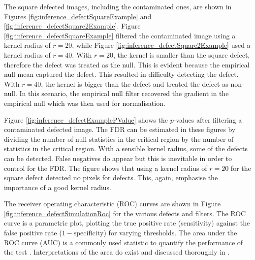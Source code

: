 The square defected images, including the contaminated ones, are shown in Figures \ref{fig:inference_defectSquareExample} and \ref{fig:inference_defectSquare2Example}. Figure \ref{fig:inference_defectSquareExample} filtered the contaminated image using a kernel radius of $r=20$, while Figure \ref{fig:inference_defectSquare2Example} used a kernel radius of $r=40$. With $r=20$, the kernel is smaller than the square defect, therefore the defect was treated as the null. This is evident because the empirical null mean captured the defect. This resulted in difficulty detecting the defect. With $r=40$, the kernel is bigger than the defect and treated the defect as non-null. In this scenario, the empirical null filter recovered the gradient in the empirical null which was then used for normalisation.

Figure \ref{fig:inference_defectExamplePValue} shows the $p$-values after filtering a contaminated defected image. The FDR can be estimated in these figures by dividing the number of null statistics in the critical region by the number of statistics in the critical region. With a sensible kernel radius, some of the defects can be detected. False negatives do appear but this is inevitable in order to control for the FDR. The figure shows that using a kernel radius of $r=20$ for the square defect detected no pixels for defects. This, again, emphasise the importance of a good kernel radius. 

The receiver operating characteristic (ROC) curves \citep{green1966signal, metz1978basic, hanley1982meaning, friedman2001elements, cook2007use} are shown in Figure \ref{fig:inference_defectSimulationRoc} for the various defects and filters. The ROC curve is a parametric plot, plotting the true positive rate (sensitivity) against the false positive rate ($1-\text{specificity}$) for varying thresholds. The area under the ROC curve (AUC) is a commonly used statistic to quantify the performance of the test \citep{friedman2001elements}. Interpretations of the area do exist \citep{metz1978basic,hanley1982meaning} and discussed thoroughly in \cite{cook2007use}.

